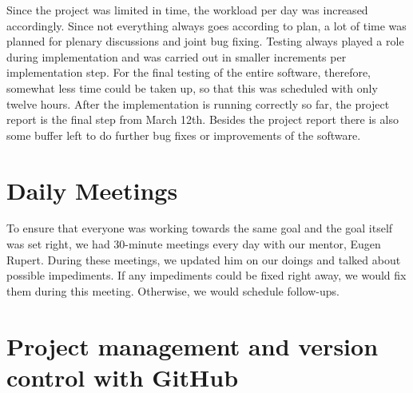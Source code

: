 \documentclass[
    fontsize=12pt,
    headings=small,
    parskip=half,           %
    bibliography=totoc,
    numbers=noenddot,       %
    open=any,               %
    ]{scrreprt}
\begin{document}
Since the project was limited in time, the workload per day was increased accordingly. Since not everything always goes according to plan, a lot of time was planned for plenary discussions and joint bug fixing. Testing always played a role during implementation and was carried out in smaller increments per implementation step. For the final testing of the entire software, therefore, somewhat less time could be taken up, so that this was scheduled with only twelve hours. After the implementation is running correctly so far, the project report is the final step from March 12th. Besides the project report there is also some buffer left to do further bug fixes or improvements of the software.

\section{Daily Meetings}
To ensure that everyone was working towards the same goal and the goal itself was set right, we had 30-minute meetings every day with our mentor, Eugen Rupert. During these meetings, we updated him on our doings and talked about possible impediments. If any impediments could be fixed right away, we would fix them during this meeting. Otherwise, we would schedule follow-ups.

\section{Project management and version control with GitHub}
\end{document}

